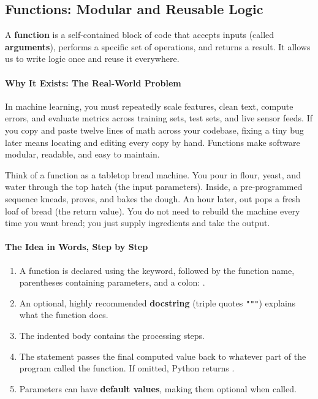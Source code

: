 \subsection{Functions: Modular and Reusable Logic}

\begin{keyidea}
A \textbf{function} is a self-contained block of code that accepts inputs (called \textbf{arguments}), performs a specific set of operations, and returns a result. It allows us to write logic once and reuse it everywhere.
\end{keyidea}

\paragraph{Why It Exists: The Real-World Problem}
In machine learning, you must repeatedly scale features, clean text, compute errors, and evaluate metrics across training sets, test sets, and live sensor feeds. If you copy and paste twelve lines of math across your codebase, fixing a tiny bug later means locating and editing every copy by hand. Functions make software modular, readable, and easy to maintain.

\begin{analogy}
Think of a function as a tabletop bread machine. You pour in flour, yeast, and water through the top hatch (the input parameters). Inside, a pre-programmed sequence kneads, proves, and bakes the dough. An hour later, out pops a fresh loaf of bread (the return value). You do not need to rebuild the machine every time you want bread; you just supply ingredients and take the output.
\end{analogy}

\paragraph{The Idea in Words, Step by Step}
\begin{enumerate}
    \item A function is declared using the  keyword, followed by the function name, parentheses containing parameters, and a colon: .
    \item An optional, highly recommended \textbf{docstring} (triple quotes \texttt{"""}) explains what the function does.
    \item The indented body contains the processing steps.
    \item The  statement passes the final computed value back to whatever part of the program called the function. If omitted, Python returns .
    \item Parameters can have \textbf{default values}, making them optional when called.
\end{enumerate}

